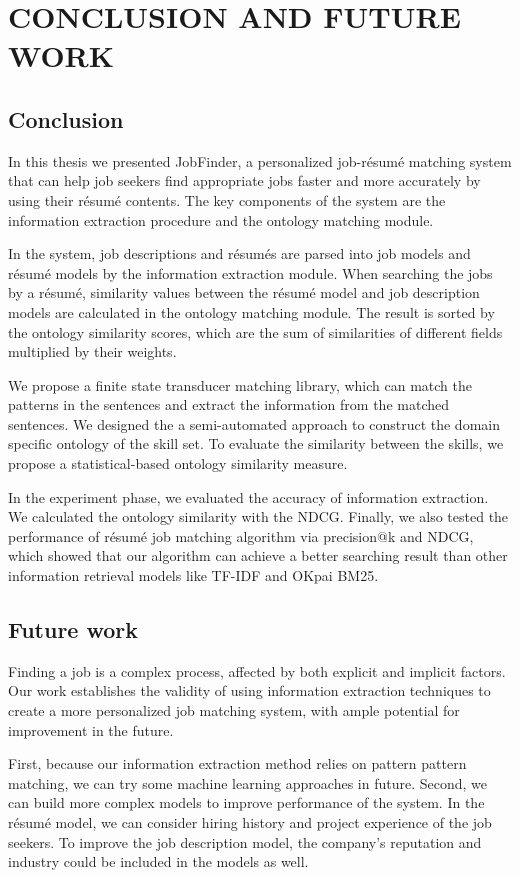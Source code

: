 \chapter{CONCLUSION AND FUTURE WORK}

\section{Conclusion}
In this thesis we presented JobFinder, a personalized job-r\'esum\'e matching system that can help job seekers find appropriate jobs faster and more accurately by using their r\'esum\'e contents. The key components of the system are the information extraction procedure and the ontology matching module.

In the system, job descriptions and r\'esum\'es are parsed into job models and r\'esum\'e models by the information extraction module. When searching the jobs by a r\'esum\'e, similarity values between the r\'esum\'e model and job description models are calculated in the ontology matching module. The result is sorted by the ontology similarity scores, which are the sum of similarities of different fields multiplied by their weights.

We propose a finite state transducer matching library, which can match the patterns in the sentences and extract the information from the matched sentences. We designed the a semi-automated approach to construct the domain specific ontology of the skill set. To evaluate the similarity between the skills, we propose a statistical-based ontology similarity measure.

In the experiment phase, we evaluated the accuracy of information extraction. We calculated the ontology similarity with the NDCG. Finally, we also tested the performance of r\'esum\'e job matching algorithm via precision@k and NDCG, which showed that our algorithm can achieve a better searching result than other information retrieval models like TF-IDF and OKpai BM25.


\section{Future work}

Finding a job is a complex process, affected by both explicit and implicit factors. Our work establishes the validity of using information extraction techniques to create a more personalized job matching system, with ample potential for improvement in the future.

First, because our information extraction method relies on pattern pattern matching, we can try some machine learning approaches in future. Second, we can build more complex models to improve performance of the system. In the r\'esum\'e model, we can consider hiring history and project experience of the job seekers. To improve the job description model, the company's reputation and industry could be included in the models as well.

